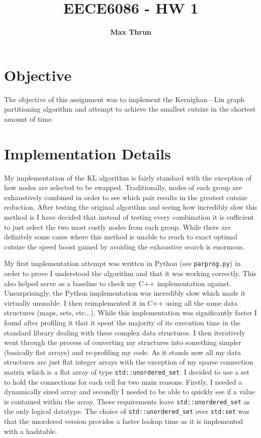 \documentclass[10pt]{article}
\title{
    \vspace{2in}
    \textmd{\textbf{EECE6086 - HW 1}}\\
    \vspace{4in}
}
\author{\textbf{Max Thrun}}
\begin{document}
\maketitle
\newpage
\section{Objective}

The objective of this assignment was to implement the Kernighan---Lin graph
partitioning algorithm and attempt to achieve the smallest cutsize in the
shortest amount of time.

\section{Implementation Details}

My implementation of the KL algorithm is fairly standard with the exception of
how nodes are selected to be swapped. Traditionally, nodes of each group are
exhaustively combined in order to see which pair results in the greatest
cutsize reduction. After testing the original algorithm and seeing how
incredibly slow this method is I have decided that instead of testing every
combination it is sufficient to just select the two most costly nodes from each
group. While there are definitely some cases where this method is unable to
reach to exact optimal cutsize the speed boost gained by avoiding the
exhaustive search is enormous.

My first implementation attempt was written in Python (see \texttt{parprog.py})
in order to prove I understood the algorithm and that it was working correctly.
This also helped serve as a baseline to check my C++ implementation against.
Unsurprisingly, the Python implementation was incredibly slow which made it
virtually unusable.  I then reimplemented it in C++ using all the same data
structures (maps, sets, etc...).  While this implementation was significantly
faster I found after profiling it that it spent the majority of its execution
time in the standard library dealing with these complex data structures. I then
iteratively went through the process of converting my structures into something
simpler (basically flat arrays) and re-profiling my code.  As it stands now all
my data structures are just flat integer arrays with the exception of my sparse
connection matrix which is a flat array of type \texttt{std::unordered\_set}. I
decided to use a set to hold the connections for each cell for two main
reasons. Firstly, I needed a dynamically sized array and secondly I needed to
be able to quickly see if a value is contained within the array. These
requirements leave \texttt{std::unordered\_set} as the only logical datatype.
The choice of \texttt{std::unordered\_set} over \texttt{std:set} was that the
unordered version provides a faster lookup time as it is implemented with a
hashtable.
\end{document}
